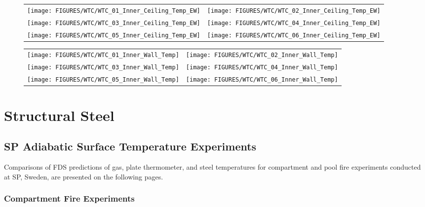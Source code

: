 \begin{figure}[p]
\begin{tabular*}{\textwidth}{l@{\extracolsep{\fill}}r}
\texttt{[image: FIGURES/WTC/WTC\_01\_Inner\_Ceiling\_Temp\_EW]} &
\texttt{[image: FIGURES/WTC/WTC\_02\_Inner\_Ceiling\_Temp\_EW]} \\
\texttt{[image: FIGURES/WTC/WTC\_03\_Inner\_Ceiling\_Temp\_EW]} &
\texttt{[image: FIGURES/WTC/WTC\_04\_Inner\_Ceiling\_Temp\_EW]} \\
\texttt{[image: FIGURES/WTC/WTC\_05\_Inner\_Ceiling\_Temp\_EW]} &
\texttt{[image: FIGURES/WTC/WTC\_06\_Inner\_Ceiling\_Temp\_EW]}
\end{tabular*}
\label{NIST_WTC_Inner_Ceiling_EW}
\end{figure}

\begin{figure}[p]
\begin{tabular*}{\textwidth}{l@{\extracolsep{\fill}}r}
\texttt{[image: FIGURES/WTC/WTC\_01\_Inner\_Wall\_Temp]} &
\texttt{[image: FIGURES/WTC/WTC\_02\_Inner\_Wall\_Temp]} \\
\texttt{[image: FIGURES/WTC/WTC\_03\_Inner\_Wall\_Temp]} &
\texttt{[image: FIGURES/WTC/WTC\_04\_Inner\_Wall\_Temp]} \\
\texttt{[image: FIGURES/WTC/WTC\_05\_Inner\_Wall\_Temp]} &
\texttt{[image: FIGURES/WTC/WTC\_06\_Inner\_Wall\_Temp]}
\end{tabular*}
\label{NIST_WTC_Inner_Wall}
\end{figure}

\clearpage


\section{Structural Steel}

\subsection{SP Adiabatic Surface Temperature Experiments}

Comparisons of FDS predictions of gas, plate thermometer, and steel temperatures for compartment and pool fire experiments conducted at SP, Sweden, are
presented on the following pages.

\subsubsection{Compartment Fire Experiments}

